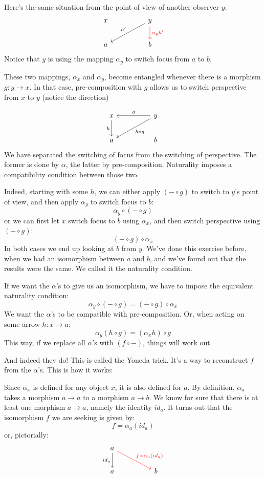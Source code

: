 \documentclass[DaoFP]{subfiles}
\begin{document}
Here's the same situation from the point of view of another observer $y$:
\[
 \begin{tikzcd}
 x
  && y
 \arrow[lld, "h'"']
 \arrow[d, red, "\alpha_y h'"]
 \\
 a
  && b
 \end{tikzcd}
\]
Notice that $y$ is using the mapping $\alpha_y$ to switch focus from $a$ to $b$. 

These two mappings, $\alpha_x$ and $\alpha_y$, become entangled whenever there is a morphism $g \colon y \to x$. In that case, pre-composition with $g$ allows us to switch perspective from $x$ to $y$ (notice the direction)

\[
 \begin{tikzcd}
 x
 \arrow[d, "h"']
 && y
 \arrow[ll, "g"']
 \arrow[lld, "h \circ g"]
 \\
 a
  && b
 \end{tikzcd}
\]
We have separated the switching of focus from the switching of perspective. The former is done by $\alpha$, the latter by pre-composition. Naturality imposes a compatibility condition between those two.

Indeed, starting with some $h$, we can either apply $(- \circ g)$ to switch to $y$'s point of view, and then apply $\alpha_y$ to switch focus to $b$:
\[ \alpha_y \circ (- \circ g) \]
or we can first let $x$ switch focus to $b$ using $\alpha_x$, and then switch perspective using $(- \circ g)$:
\[ (- \circ g) \circ \alpha_x \]
In both cases we end up looking at $b$ from $y$. We've done this exercise before, when we had an isomorphism between $a$ and $b$, and we've found out that the results were the same. We called it the naturality condition. 

If we want the $\alpha$'s to give us an isomorphism, we have to impose the equivalent naturality condition:
\[ \alpha_y \circ (- \circ g) = (- \circ g) \circ \alpha_x \]
We want the $\alpha$'s to be compatible with pre-composition.
Or, when acting on some arrow $h \colon x \to a$:
\[\alpha_y(h \circ g) = (\alpha_x h) \circ g \]
This way, if we replace all $\alpha$'s with $(f \circ -)$, things will work out. 

And indeed they do! This is called the Yoneda trick. It's a way to reconstruct $f$ from the $\alpha$'s. This is how it works:

Since $\alpha_x$ is defined for any object $x$, it is also defined for $a$. By definition, $\alpha_a$ takes a morphism $a \to a$ to a morphism $a \to b$. We know for sure that there is at least one morphism $a \to a$, namely the identity $id_a$. It turns out that the isomorphism $f$ we are seeking is given by:
\[f = \alpha_a (id_a)\]
or, pictorially:
\[
 \begin{tikzcd}
a
 \arrow[d, "id_a"']
 \arrow[rrd, red, "f = \alpha_a (id_a)"]
  \\
 a
  && b
 \end{tikzcd}
\]
\end{document}
